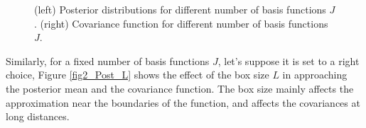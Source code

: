 \documentclass[]{interact}
\theoremstyle{plain}%
\theoremstyle{definition}
\theoremstyle{remark}
\begin{document}
\begin{figure}[H]
\caption{(left) Posterior distributions for different number of basis functions $J$. (right) Covariance function for different number of basis functions $J$.}
  \label{fig1_Post_J}
\end{figure}

Similarly, for a fixed number of basis functions $J$, let's suppose it is set to a right choice, Figure \ref{fig2_Post_L} shows the effect of the box size $L$ in approaching the posterior mean and the covariance function. The box size mainly affects the approximation near the boundaries of the function, and affects the covariances at long distances.

\begin{figure}[H]
\centering
{}

\end{figure}
\end{document}
